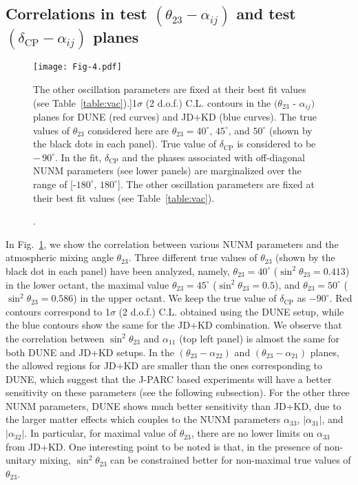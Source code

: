 \documentclass[11pt,a4paper]{article}
\newcommand{\capdef}{}
\newcommand{\mycaption}[2][\capdef]{\renewcommand{\capdef}{#2}
	\caption[#1]{{\footnotesize #2}}}
\begin{document}
\subsection{Correlations in test $(\theta_{23}-\alpha_{ij})$ and test $(\delta_{\mathrm{CP}}-\alpha_{ij})$ planes}
\label{subsec:correlation}
\begin{figure}[h!]
\centering
\texttt{[image: Fig-4.pdf]}
\mycaption{1$\sigma$ (2 d.o.f.) C.L. contours in the $(\theta_{23}$ - $\alpha_{ij})$ planes for DUNE (red curves) and JD+KD (blue curves). The true values of $\theta_{23}$ considered here are $\theta_{23}=40^{\circ},\, 45^{\circ}$, and $50^{\circ}$ (shown by the black dots in each panel). True value of $\delta_{\mathrm{CP}}$ is considered to be $-\,90^{\circ}$. In the fit, $\delta_{\mathrm{CP}}$ and the phases associated with off-diagonal NUNM parameters (see lower panels) are marginalized over the range of [-$180^{\circ}$, $180^{\circ}$]. The other oscillation parameters are fixed at their best fit values (see Table~\ref{table:vac}).}
\label{fig:th23_corr}
\end{figure}

In Fig.~\ref{fig:th23_corr}, we show the correlation between various NUNM parameters and the atmospheric mixing angle $\theta_{23}$. 
 Three different true values of $\theta_{23}$ (shown by the black dot in each panel) have been analyzed, namely, $\theta_{23}=40^{\circ}$ ($\sin^2\theta_{23} = 0.413$) in the lower octant, the maximal value $\theta_{23}=45^{\circ}$ ($\sin^2\theta_{23} = 0.5$), and $\theta_{23}=50^{\circ}$ ($\sin^2\theta_{23} = 0.586$) in the upper octant. 
We keep the true value of $\delta_{\mathrm{CP}}$ as $-90^{\circ}$. Red contours correspond to 1$\sigma$ (2 d.o.f.) C.L. obtained using the DUNE setup, while the blue contours show the same for the  JD+KD combination. We observe that the correlation between $\sin^2\theta_{23}$ and $\alpha_{11}$ (top left panel) is almost the same for both DUNE and JD+KD setups. In the $(\theta_{23}-\alpha_{22})$ and $(\theta_{23}-\alpha_{21})$ planes, the allowed regions for JD+KD are smaller than the ones corresponding to DUNE, which suggest that the J-PARC based experiments will have a better sensitivity on these parameters (see the following subsection). For the other three NUNM parameters, DUNE shows much better sensitivity than JD+KD, due to the larger matter effects which couples to the NUNM parameters $\alpha_{33}$, $|\alpha_{31}|$, and $|\alpha_{32}|$. In particular, for maximal value of $\theta_{23}$, there are no lower limits on $\alpha_{33}$ from JD+KD. One interesting point to be noted is that, in the presence of non-unitary mixing, $\sin^2\theta_{23}$ can be constrained better for non-maximal true values of $\theta_{23}$.
\end{document}
